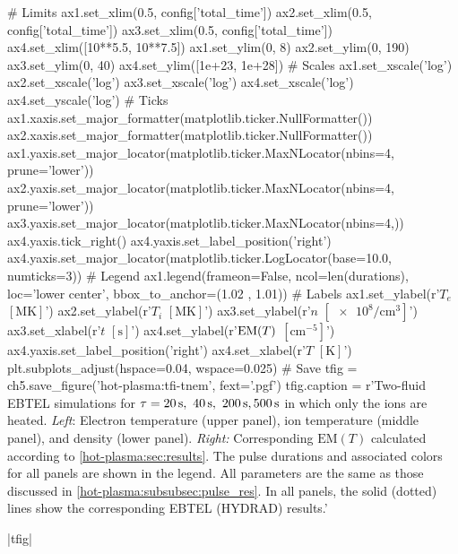 \begin{pycode}[chapter5]
# Limits
ax1.set_xlim(0.5, config['total_time'])
ax2.set_xlim(0.5, config['total_time'])
ax3.set_xlim(0.5, config['total_time'])
ax4.set_xlim([10**5.5, 10**7.5])
ax1.set_ylim(0, 8)
ax2.set_ylim(0, 190)
ax3.set_ylim(0, 40)
ax4.set_ylim([1e+23, 1e+28])
# Scales
ax1.set_xscale('log')
ax2.set_xscale('log')
ax3.set_xscale('log')
ax4.set_xscale('log')
ax4.set_yscale('log')
# Ticks
ax1.xaxis.set_major_formatter(matplotlib.ticker.NullFormatter())
ax2.xaxis.set_major_formatter(matplotlib.ticker.NullFormatter())
ax1.yaxis.set_major_locator(matplotlib.ticker.MaxNLocator(nbins=4, prune='lower'))
ax2.yaxis.set_major_locator(matplotlib.ticker.MaxNLocator(nbins=4, prune='lower'))
ax3.yaxis.set_major_locator(matplotlib.ticker.MaxNLocator(nbins=4,))
ax4.yaxis.tick_right()
ax4.yaxis.set_label_position('right')
ax4.yaxis.set_major_locator(matplotlib.ticker.LogLocator(base=10.0, numticks=3))
# Legend
ax1.legend(frameon=False, ncol=len(durations), loc='lower center',
            bbox_to_anchor=(1.02 , 1.01))
# Labels
ax1.set_ylabel(r'$T_e$ $[\si{\mega\kelvin}]$')
ax2.set_ylabel(r'$T_i$ $[\si{\mega\kelvin}]$')
ax3.set_ylabel(r'$n$ $[\num{e8}\si{\per\cubic\cm}]$')
ax3.set_xlabel(r'$t$ $[\si{\second}]$')
ax4.set_ylabel(r'$\textup{EM}(T)$ $[\si{\cm\tothe{-5}}]$')
ax4.yaxis.set_label_position('right')
ax4.set_xlabel(r'$T$ $[\si{\kelvin}]$')
plt.subplots_adjust(hspace=0.04, wspace=0.025)
# Save
tfig = ch5.save_figure('hot-plasma:tfi-tnem', fext='.pgf')
tfig.caption = r'Two-fluid EBTEL simulations for $\tau=\SIlist[list-final-separator = {,}]{20;40;200;500}{\second}$ in which only the ions are heated. \textit{Left}: Electron temperature (upper panel), ion temperature (middle panel), and density (lower panel). \textit{Right:} Corresponding $\mathrm{EM}(T)$ calculated according to \autoref{hot-plasma:sec:results}. The pulse durations and associated colors for all panels are shown in the legend. All parameters are the same as those discussed in \autoref{hot-plasma:subsubsec:pulse_res}. In all panels, the solid (dotted) lines show the corresponding EBTEL (HYDRAD) results.'
\end{pycode}
\py[chapter5]|tfig|

